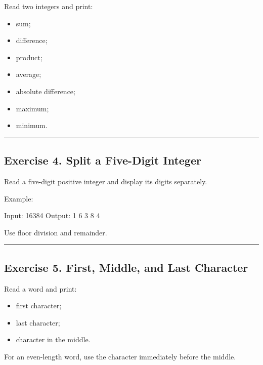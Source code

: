 \documentclass[
]{article}
\newenvironment{Shaded}{\begin{snugshade}}{\end{snugshade}}
\newcommand{\NormalTok}[1]{#1}
\providecommand{\tightlist}{%
  \setlength{\itemsep}{0pt}\setlength{\parskip}{0pt}}
\begin{document}
Read two integers and print:

\begin{itemize}
\tightlist
\item
  sum;
\item
  difference;
\item
  product;
\item
  average;
\item
  absolute difference;
\item
  maximum;
\item
  minimum.
\end{itemize}

\begin{center}\rule{0.5\linewidth}{0.5pt}\end{center}

\subsection{Exercise 4. Split a Five-Digit
Integer}\label{exercise-4.-split-a-five-digit-integer}

Read a five-digit positive integer and display its digits separately.

Example:

\begin{Shaded}
\begin{Highlighting}[]
\NormalTok{Input: 16384}
\NormalTok{Output: 1 6 3 8 4}
\end{Highlighting}
\end{Shaded}

Use floor division and remainder.

\begin{center}\rule{0.5\linewidth}{0.5pt}\end{center}

\subsection{Exercise 5. First, Middle, and Last
Character}\label{exercise-5.-first-middle-and-last-character}

Read a word and print:

\begin{itemize}
\tightlist
\item
  first character;
\item
  last character;
\item
  character in the middle.
\end{itemize}

For an even-length word, use the character immediately before the
middle.
\end{document}
